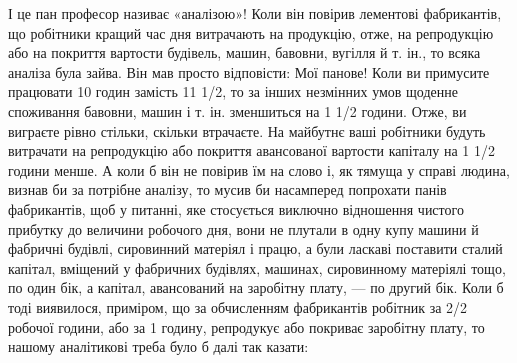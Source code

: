 І це пан професор називає «аналізою»! Коли він повірив лементові фабрикантів, що робітники кращий
час дня витрачають
на продукцію, отже, на репродукцію або на покриття вартости будівель, машин, бавовни, вугілля й т.
ін., то всяка аналіза
була зайва. Він мав просто відповісти: Мої панове! Коли ви примусите працювати 10 годин замість 11
1/2, то за інших незмінних
умов щоденне споживання бавовни, машин і т. ін. зменшиться на 1 1/2 години. Отже, ви виграєте
рівно стільки, скільки втрачаєте. На майбутнє ваші робітники будуть витрачати на репродукцію
або покриття авансованої вартости капіталу на 1 1/2 години менше. А коли б він не повірив їм на
слово і, як тямуща у справі людина, визнав би за потрібне аналізу, то мусив би насамперед попрохати
панів фабрикантів, щоб у питанні, яке стосується
виключно відношення чистого прибутку до величини робочого дня, вони не плутали в одну купу машини й
фабричні будівлі,
сировинний матеріял і працю, а були ласкаві поставити сталий капітал, вміщений у фабричних будівлях,
машинах, сировинному матеріялі тощо, по один бік, а капітал, авансований на заробітну
плату, — по другий бік. Коли б тоді виявилося, приміром, що за обчисленням фабрикантів робітник за
2/2 робочої години, або за 1 годину, репродукує або покриває заробітну плату, то нашому
аналітикові треба було б далі так казати:

